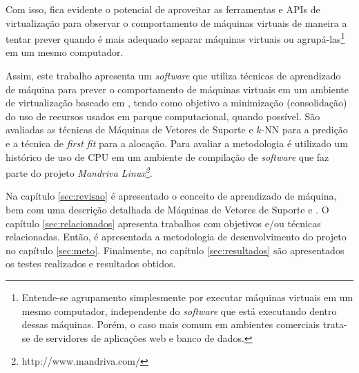Com isso, fica evidente o potencial de aproveitar as ferramentas e APIs de
virtualização para observar o comportamento de máquinas virtuais de maneira
a tentar prever quando é mais adequado separar máquinas virtuais ou
agrupá-las\footnote{Entende-se agrupamento simplesmente por
executar máquinas virtuais em um mesmo computador, independente do
\emph{software}
que está executando dentro dessas máquinas. Porém, o caso mais comum em
ambientes comerciais trata-se de servidores de aplicações web e banco de
dados.} em um mesmo computador. 

Assim, este trabalho apresenta um \emph{software} que utiliza técnicas de
aprendizado de máquina para prever o comportamento de máquinas
virtuais em um ambiente de virtualização baseado em \libvirt{}, tendo como
objetivo a minimização (consolidação) do uso de recursos usados em parque
computacional, quando possível. São avaliadas as técnicas de Máquinas de
Vetores de Suporte e $k$-NN para a predição e a técnica de \emph{first fit} para
a alocação. Para avaliar a metodologia é utilizado um histórico de uso de CPU
em um ambiente de compilação de \emph{software} que faz parte do projeto \emph{Mandriva
Linux\footnote{http://www.mandriva.com/}}.

Na capítulo \ref{sec:revisao} é apresentado o conceito de aprendizado de
máquina, bem com uma descrição detalhada de Máquinas de Vetores de Suporte
e . O capítulo \ref{sec:relacionados} apresenta trabalhos com objetivos
e/ou técnicas relacionadas. Então, é apresentada a metodologia de
desenvolvimento do projeto no capítulo \ref{sec:meto}. Finalmente, no
capítulo \ref{sec:resultados} são apresentados os testes realizados e
resultados obtidos.
